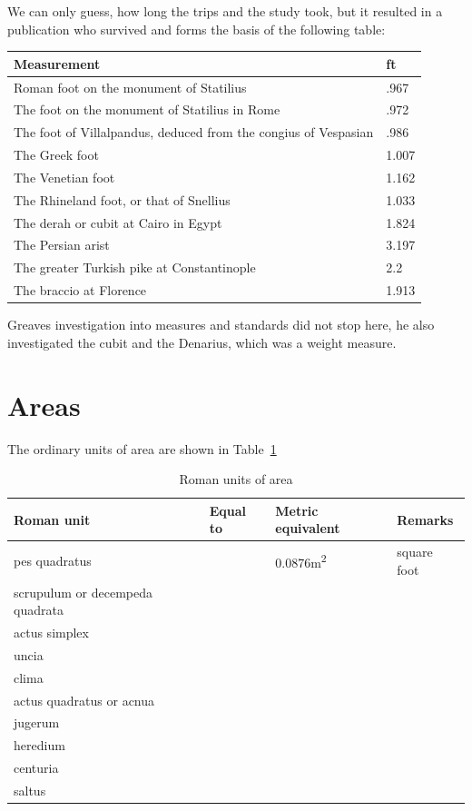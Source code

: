 We can only guess, how long the trips and the study took, but it resulted in a publication who survived and forms the basis of the following table:
\medskip

\begin{tabular}{p{8cm}l}
\toprule
Measurement & ft\\
\midrule
Roman foot on the monument of Statilius & .967\\
The foot on the monument of Statilius in Rome & .972\\
The foot of Villalpandus, deduced from the congius of Vespasian & .986\\ 
The Greek foot & 1.007\\
The Venetian foot &1.162\\
The Rhineland foot, or that of Snellius &1.033\\
The derah or cubit at Cairo in Egypt &1.824\\
The Persian arist &3.197\\
The greater Turkish pike at Constantinople & 2.2\\
The braccio at Florence & 1.913\\

\bottomrule
\end{tabular}
\medskip

Greaves investigation into measures and standards did not stop here, he also investigated the cubit and the Denarius, which was a weight measure.

\section{Areas}

The ordinary units of area are shown in Table~\ref{tbl:romanareaunits}

\begin{table}[htbp]
\small\raggedright
\begin{tabular}{p{2.5cm}lll}
\toprule
Roman unit &   Equal to & Metric equivalent & Remarks\\
\midrule
pes  quadratus &  &0.0876\si{\square\meter} & square foot\\
scrupulum or decempeda quadrata & & &\\
actus simplex & & &\\
uncia         & & &\\
clima         & & &\\
actus quadratus or acnua & & &\\
jugerum                  & & &\\
heredium                 & & &\\
centuria                 & & &\\
saltus                   & & &\\
\bottomrule
\end{tabular}

\caption{Roman units of area}
\label{tbl:romanareaunits}

\end{table}


